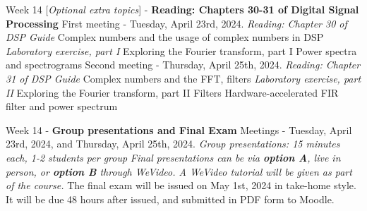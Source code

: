 \documentclass[10pt]{article}
\begin{document}
\begin{outline}[enumerate]
\1 Week 14 [\textit{Optional extra topics}] - \textbf{Reading: Chapters 30-31 of Digital Signal Processing}
\2 First meeting - Tuesday, April 23rd, 2024. \textit{Reading: Chapter 30 of DSP Guide}
\3 Complex numbers and the usage of complex numbers in DSP
\3 \textit{Laboratory exercise, part I}
\4 Exploring the Fourier transform, part I
\4 Power spectra and spectrograms
\2 Second meeting - Thursday, April 25th, 2024. \textit{Reading: Chapter 31 of DSP Guide}
\3 Complex numbers and the FFT, filters
\3 \textit{Laboratory exercise, part II}
\4 Exploring the Fourier transform, part II
\4 Filters
\4 Hardware-accelerated FIR filter and power spectrum

\1 Week 14 - \textbf{Group presentations and Final Exam}
\2 Meetings - Tuesday, April 23rd, 2024, and Thursday, April 25th, 2024.
\3 \textit{Group presentations: 15 minutes each, 1-2 students per group}
\3 \textit{Final presentations can be via \textbf{option A}, live in person, or \textbf{option B} through WeVideo. A WeVideo tutorial will be given as part of the course.}
\2 The final exam will be issued on May 1st, 2024 in take-home style.  It will be due 48 hours after issued, and submitted in PDF form to Moodle.
\end{outline}
\end{document}
